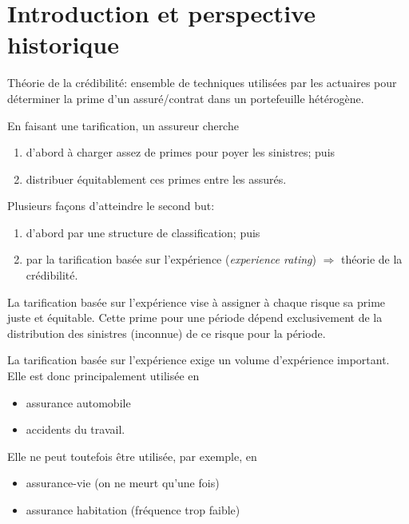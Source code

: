 
\chapter{Introduction et perspective historique}
\label{chap:introduction-historique:introduction}


Théorie de la crédibilité: ensemble de techniques utilisées par les
actuaires pour déterminer la prime d'un assuré/contrat dans un
portefeuille hétérogène.

En faisant une tarification, un assureur cherche
\begin{enumerate}
\item d'abord à charger assez de primes pour poyer les sinistres; puis
\item distribuer équitablement ces primes entre les assurés.
\end{enumerate}

Plusieurs façons d'atteindre le second but:
\begin{enumerate}
\item d'abord par une structure de classification; puis
\item par la tarification basée sur l'expérience (\emph{experience
    rating}) $\Rightarrow$ théorie de la crédibilité.
\end{enumerate}

\begin{definition}
  La tarification basée sur l'expérience vise à assigner à chaque
  risque sa prime juste et équitable. Cette prime pour une période
  dépend exclusivement de la distribution des sinistres (inconnue) de
  ce risque pour la période. \citep{Buhlmann:credibility:1969}
\end{definition}

La tarification basée sur l'expérience exige un volume d'expérience
important. Elle est donc principalement utilisée en
\begin{itemize}
\item assurance automobile
\item accidents du travail.
\end{itemize}
Elle ne peut toutefois être utilisée, par exemple, en
\begin{itemize}
\item assurance-vie (on ne meurt qu'une fois)
\item assurance habitation (fréquence trop faible)
\end{itemize}


